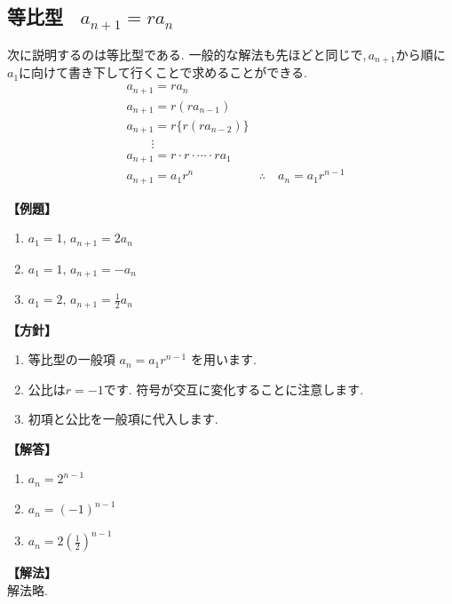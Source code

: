 
  \subsection{等比型 \, $a_{n+1}=ra_n$}
    次に説明するのは等比型である.
    一般的な解法も先ほどと同じで,\,$a_{n+1}$から順に$a_1$に向けて書き下して行くことで求めることができる.
    \begin{align*}
      &a_{n+1}=ra_n\\
      &a_{n+1}=r(ra_{n-1})\\
      &a_{n+1}=r\{r(ra_{n-2})\}\\
      &\qquad \vdots\\
      &a_{n+1}=r\cdot r \cdot \cdots \cdot ra_1\\
      &a_{n+1}=a_1r^n
      &\therefore \quad a_n=a_1r^{n-1}
    \end{align*}

    \noindent \textbf{【例題】}
    \begin{enumerate}[label=(\arabic*),parsep=3pt]
      \item $\displaystyle a_1=1,\, a_{n+1}=2a_n$
      \item $\displaystyle a_1=1,\, a_{n+1}=-a_n$
      \item $\displaystyle a_1=2,\, a_{n+1}=\frac{1}{2}a_n$
    \end{enumerate}

    \noindent\textbf{【方針】}
    \begin{enumerate}[label=(\arabic*),parsep=3pt]
      \item 等比型の一般項
            $\displaystyle a_n=a_1r^{n-1}$
            を用います.
      \item 公比は$r=-1$です.
            符号が交互に変化することに注意します.
      \item 初項と公比を一般項に代入します.
    \end{enumerate}

    \noindent\textbf{【解答】}
    \begin{enumerate}[label=(\arabic*),parsep=3pt]
      \item $\displaystyle a_n=2^{n-1}$
      \item $\displaystyle a_n=(-1)^{n-1}$
      \item $\displaystyle a_n=2\left(\frac12\right)^{n-1}$
    \end{enumerate}

    \noindent\textbf{【解法】}\\
    解法略.

